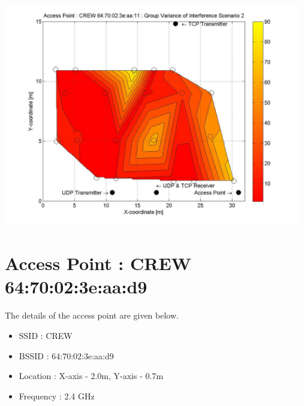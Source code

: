\documentclass[11pt,a4paper,headinclude,footinclude,chapterprefix=on]{scrreprt}
\begin{document}
\begin{longtable}
	\includegraphics[width=13cm]{../../Source/plot/CREW_11/11_Wifi_Group_Variance.jpg} \\
\end{longtable}
\section{Access Point : CREW 64:70:02:3e:aa:d9} 
The details of the access point are given below.
\begin{itemize}
	\item SSID : CREW 
	\item BSSID : 64:70:02:3e:aa:d9 
	\item Location : X-axis - 2.0m, Y-axis - 0.7m 
	\item Frequency : 2.4 GHz 
\end{itemize}
\end{document}
